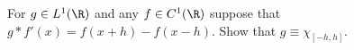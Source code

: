 For $g\in L^1(\R)$ and any $f\in C^1(\R)$ suppose that $g \ast
f'(x)=f(x+h)-f(x-h)$. Show that $g \equiv \chi_{[-h,h]}$.
